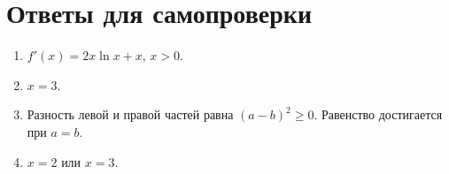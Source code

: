 \clearpage
\section*{Ответы для самопроверки}
\begin{enumerate}
  \item $f'(x)=2x\ln x+x$, $x>0$.
  \item $x=3$.
  \item Разность левой и правой частей равна $(a-b)^2\geq0$. Равенство достигается при $a=b$.
  \item $x=2$ или $x=3$.
\end{enumerate}
